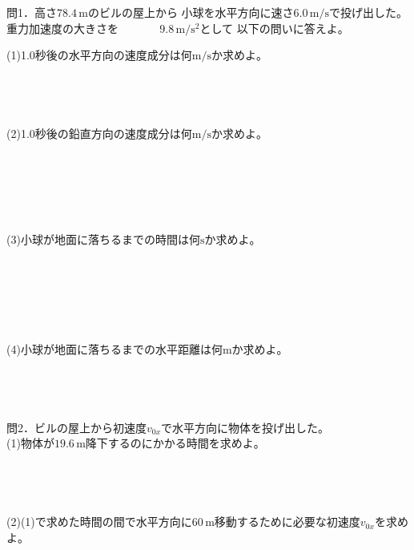 \documentclass[11pt,twoside]{article}
\begin{document}
	
	問1．高さ$78.4\,\si{\metre}$のビルの屋上から
	小球を水平方向に速さ$6.0\,\si{\metre\per\second}$で投げ出した。
	重力加速度の大きさを　　　\,\,\,\,$9.8\,\si{\metre\per\second\squared}$として
	以下の問いに答えよ。\\
	\begin{minipage}[t]{0.60\linewidth}
	(1)1.0秒後の水平方向の速度成分は何$\si{\metre\per\second}$か求めよ。\\\\\\\\\\
	(2)1.0秒後の鉛直方向の速度成分は何$\si{\metre\per\second}$か求めよ。\\\\\\\\\\
	\end{minipage}
	\hfill
	\begin{minipage}[t]{0.30\linewidth}
	\end{minipage}\\
	(3)小球が地面に落ちるまでの時間は何$\si{\second}$か求めよ。\\\\\\\\\\\\\\
	(4)小球が地面に落ちるまでの水平距離は何$\si{\metre}$か求めよ。\\\\\\\\\\
	問2．ビルの屋上から初速度$v_{0x}$で水平方向に物体を投げ出した。\\
	(1)物体が$19.6\,\si{\metre}$降下するのにかかる時間を求めよ。\\\\\\\\\\
	(2)(1)で求めた時間の間で水平方向に$60\,\si{\metre}$移動するために必要な初速度$v_{0x}$を求めよ。\\\\\\\\\\
	
\end{document}
